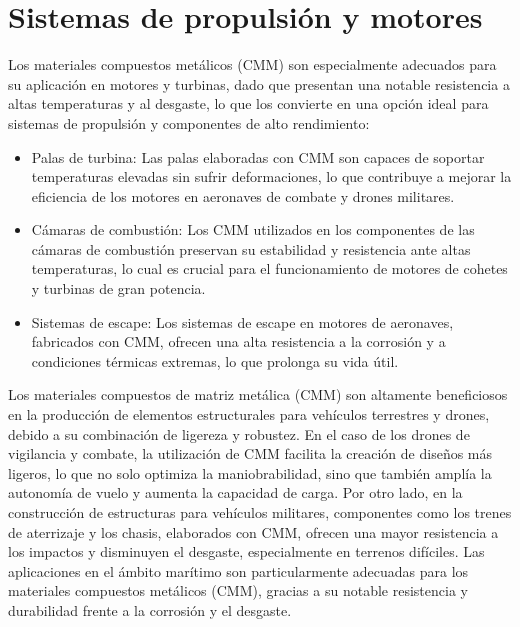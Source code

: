 \documentclass[letterpaper, 12pt]{article}
\begin{document}
\section{Sistemas de propulsión y motores }

Los materiales compuestos metálicos (CMM) son especialmente adecuados para su
aplicación en motores y turbinas, dado que presentan una notable resistencia a
altas temperaturas y al desgaste, lo que los convierte en una opción ideal para
sistemas de propulsión y componentes de alto rendimiento:

\begin{itemize}
      \item Palas de turbina: Las palas elaboradas con CMM son capaces de soportar
            temperaturas elevadas sin sufrir deformaciones, lo que contribuye a mejorar la
            eficiencia de los motores en aeronaves de combate y drones militares.
      \item Cámaras de combustión: Los CMM utilizados en los componentes de las cámaras de
            combustión preservan su estabilidad y resistencia ante altas temperaturas, lo
            cual es crucial para el funcionamiento de motores de cohetes y turbinas de gran
            potencia.
      \item Sistemas de escape: Los sistemas de escape en motores de aeronaves, fabricados
            con CMM, ofrecen una alta resistencia a la corrosión y a condiciones térmicas
            extremas, lo que prolonga su vida útil.

\end{itemize}

Los materiales compuestos de matriz metálica (CMM) son altamente beneficiosos
en la producción de elementos estructurales para vehículos terrestres y drones,
debido a su combinación de ligereza y robustez. En el caso de los drones de
vigilancia y combate, la utilización de CMM facilita la creación de diseños más
ligeros, lo que no solo optimiza la maniobrabilidad, sino que también amplía la
autonomía de vuelo y aumenta la capacidad de carga. Por otro lado, en la
construcción de estructuras para vehículos militares, componentes como los
trenes de aterrizaje y los chasis, elaborados con CMM, ofrecen una mayor
resistencia a los impactos y disminuyen el desgaste, especialmente en terrenos
difíciles. Las aplicaciones en el ámbito marítimo son particularmente adecuadas
para los materiales compuestos metálicos (CMM), gracias a su notable
resistencia y durabilidad frente a la corrosión y el desgaste.
\end{document}
